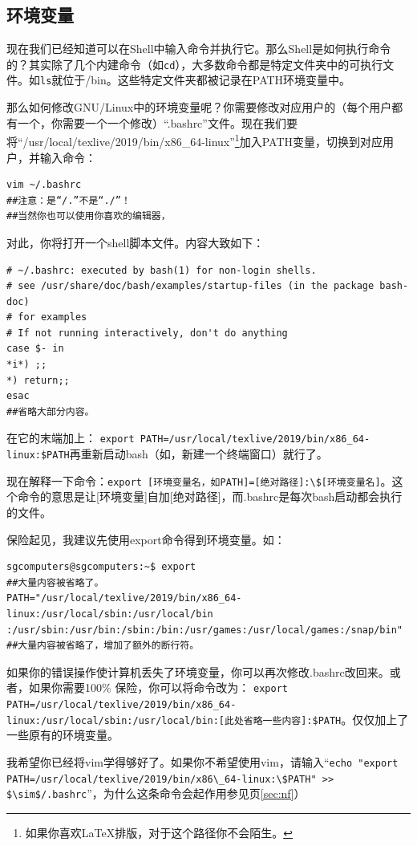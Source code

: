 \subsection{环境变量}
现在我们已经知道可以在Shell中输入命令并执行它。那么Shell是如何执行命令的？其实除了几个内建命令（如\verb|cd|），大多数命令都是特定文件夹中的可执行文件。如\verb|ls|就位于/bin。这些特定文件夹都被记录在PATH环境变量中。\par
那么如何修改GNU/Linux中的环境变量呢？你需要修改对应用户的（每个用户都有一个，你需要一个一个修改）“.bashrc”文件。现在我们要将“/usr/local/texlive/2019/bin/x86\_64-linux”\footnote{如果你喜欢\LaTeX 排版，对于这个路径你不会陌生。}加入PATH变量，切换到对应用户，并输入命令：
\begin{verbatim}
vim ~/.bashrc
##注意：是“/.”不是“./”！
##当然你也可以使用你喜欢的编辑器，
\end{verbatim} \par
对此，你将打开一个shell脚本文件。内容大致如下：
\begin{verbatim}
# ~/.bashrc: executed by bash(1) for non-login shells.
# see /usr/share/doc/bash/examples/startup-files (in the package bash-doc)
# for examples
# If not running interactively, don't do anything
case $- in
*i*) ;;
*) return;;
esac
##省略大部分内容。
\end{verbatim} \par
在它的末端加上：
\verb|export PATH=/usr/local/texlive/2019/bin/x86_64-linux:$PATH|再重新启动bash（如，新建一个终端窗口）就行了。\par
现在解释一下命令：\verb|export [环境变量名，如PATH]=[绝对路径]:\$[环境变量名]|。这个命令的意思是让[环境变量]自加[绝对路径]，而.bashrc是每次bash启动都会执行的文件。\par
保险起见，我建议先使用export命令得到环境变量。如：
\begin{verbatim}
sgcomputers@sgcomputers:~$ export
##大量内容被省略了。
PATH="/usr/local/texlive/2019/bin/x86_64-linux:/usr/local/sbin:/usr/local/bin
:/usr/sbin:/usr/bin:/sbin:/bin:/usr/games:/usr/local/games:/snap/bin"
##大量内容被省略了，增加了额外的断行符。
\end{verbatim} \par
如果你的错误操作使计算机丢失了环境变量，你可以再次修改.bashrc改回来。或者，如果你需要100\% 保险，你可以将命令改为：
\verb|export PATH=/usr/local/texlive/2019/bin/x86_64-linux:/usr/local/sbin:/usr/local/bin:[此处省略一些内容]:$PATH|。仅仅加上了一些原有的环境变量。\par
我希望你已经将vim学得够好了。如果你不希望使用vim，请输入“\verb|echo "export PATH=/usr/local/texlive/2019/bin/x86\_64-linux:\$PATH" >> $\sim$/.bashrc|”，为什么这条命令会起作用参见\pageref{sec:nf}页\ref{sec:nf}）
